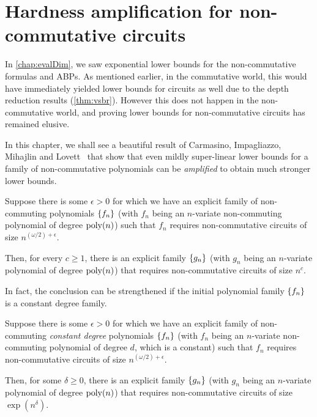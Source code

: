 \chapter{Hardness amplification for non-commutative circuits}
\label{chap:nc-hardness-amp}

In \autoref{chap:evalDim}, we saw exponential lower bounds for the non-commutative formulas and ABPs. As mentioned earlier, in the commutative world, this would have immediately yielded lower bounds for circuits as well due to the depth reduction results (\autoref{thm:vsbr}). However this does not happen in the non-commutative world, and proving lower bounds for non-commutative circuits has remained elusive.

In this chapter, we shall see a beautiful result of Carmasino, Impagliazzo, Mihajlin and Lovett~\cite{CILM18} that show that even mildly super-linear lower bounds for a family of non-commutative polynomials can be \emph{amplified} to obtain much stronger lower bounds.

\begin{theorem} \label{thm:CILM18-mainthm}
  Suppose there is some $\epsilon > 0$ for which we have an explicit family of non-commuting polynomials $\left\{f_n\right\}$ (with $f_n$ being an $n$-variate non-commuting polynomial of degree $\operatorname{poly}(n)$) such that $f_n$ requires non-commutative circuits of size $n^{(\omega/2) + \epsilon}$.

  Then, for every $c \geq 1$, there is an explicit family $\left\{g_n\right\}$ (with $g_n$ being an $n$-variate polynomial of degree $\operatorname{poly}(n)$) that requires non-commutative circuits of size $n^c$. 
\end{theorem}

In fact, the conclusion can be strengthened if the initial polynomial family $\left\{f_n\right\}$ is a constant degree family.

\begin{theorem} \label{thm:CILM18-mainthm-constdeg}
  Suppose there is some $\epsilon > 0$ for which we have an explicit family of non-commuting \emph{constant degree} polynomials $\left\{f_n\right\}$ (with $f_n$ being an $n$-variate non-commuting polynomial of degree $d$, which is a constant) such that $f_n$ requires non-commutative circuits of size $n^{(\omega/2) + \epsilon}$.

  Then, for some $\delta \geq 0$, there is an explicit family $\left\{g_n\right\}$ (with $g_n$ being an $n$-variate polynomial of degree $\operatorname{poly}(n)$) that requires non-commutative circuits of size $\exp(n^{\delta})$. 
\end{theorem}

